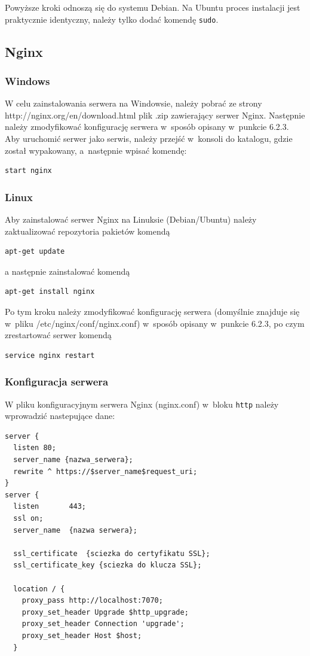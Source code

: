 \documentclass[12pt,a4paper,notitlepage]{article}
\begin{document}
Powyższe kroki odnoszą się do systemu Debian. Na Ubuntu proces instalacji jest praktycznie identyczny, należy tylko dodać komendę \texttt{sudo}.

\subsection{Nginx}
\subsubsection{Windows}
W celu zainstalowania serwera na Windowsie, należy pobrać ze strony \\ http://nginx.org/en/download.html plik .zip zawierający serwer Nginx. Następnie należy zmodyfikować konfigurację serwera w~sposób opisany w~punkcie 6.2.3. Aby uruchomić serwer jako serwis, należy przejść w~konsoli do katalogu, gdzie został wypakowany, a~następnie wpisać komendę:
\begin{lstlisting}
start nginx
\end{lstlisting}

\subsubsection{Linux}
Aby zainstalować serwer Nginx na Linuksie (Debian/Ubuntu) należy zaktualizować repozytoria pakietów komendą
\begin{lstlisting}
apt-get update
\end{lstlisting}
a następnie zainstalować komendą
\begin{lstlisting}
apt-get install nginx
\end{lstlisting}
Po tym kroku należy zmodyfikować konfigurację serwera (domyślnie znajduje się w~pliku /etc/nginx/conf/nginx.conf) w~sposób opisany w~punkcie 6.2.3, po czym zrestartować serwer komendą
\begin{lstlisting}
service nginx restart
\end{lstlisting}

\subsubsection{Konfiguracja serwera}
W pliku konfiguracyjnym serwera Nginx (nginx.conf) w~bloku \texttt{http} należy wprowadzić nastepujące dane:
\begin{lstlisting}
server {
  listen 80;
  server_name {nazwa_serwera};
  rewrite ^ https://$server_name$request_uri;
}
server {
  listen       443;
  ssl on;
  server_name  {nazwa serwera};

  ssl_certificate  {sciezka do certyfikatu SSL};
  ssl_certificate_key {sciezka do klucza SSL};

  location / {
    proxy_pass http://localhost:7070;
    proxy_set_header Upgrade $http_upgrade;
    proxy_set_header Connection 'upgrade';
    proxy_set_header Host $host;
  }
\end{lstlisting}
\end{document}
